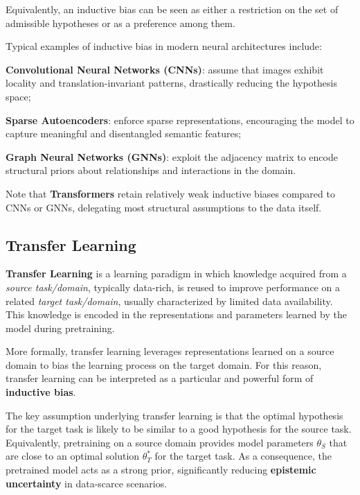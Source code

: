 Equivalently, an inductive bias can be seen as either a restriction on the set of admissible
hypotheses or as a preference among them.

Typical examples of inductive bias in modern neural architectures include:
\begin{compactitemize}
    \item \textbf{Convolutional Neural Networks (CNNs)}: assume that images exhibit locality
    and translation-invariant patterns, drastically reducing the hypothesis space;
    \item \textbf{Sparse Autoencoders}: enforce sparse representations, encouraging the model
    to capture meaningful and disentangled semantic features;
    \item \textbf{Graph Neural Networks (GNNs)}: exploit the adjacency matrix to encode structural
    priors about relationships and interactions in the domain.
\end{compactitemize}

\begin{infobox}[Note]
    Note that \textbf{Transformers} retain relatively weak inductive biases compared to CNNs or GNNs, delegating most structural assumptions to the data itself.
\end{infobox}

\subsection{Transfer Learning}
\textbf{Transfer Learning} is a learning paradigm in which knowledge acquired from a
\emph{source task/domain}, typically data-rich, is reused to improve performance on a related
\emph{target task/domain}, usually characterized by limited data availability.
This knowledge is encoded in the representations and parameters learned by the model during
pretraining.

More formally, transfer learning leverages representations learned on a source domain to bias
the learning process on the target domain.
For this reason, transfer learning can be interpreted as a particular and powerful form of
\textbf{inductive bias}.

The key assumption underlying transfer learning is that the optimal hypothesis for the target
task is likely to be similar to a good hypothesis for the source task.
Equivalently, pretraining on a source domain provides model parameters $\theta_S$ that are close
to an optimal solution $\theta_T^*$ for the target task.
As a consequence, the pretrained model acts as a strong prior, significantly reducing
\textbf{epistemic uncertainty} in data-scarce scenarios.

